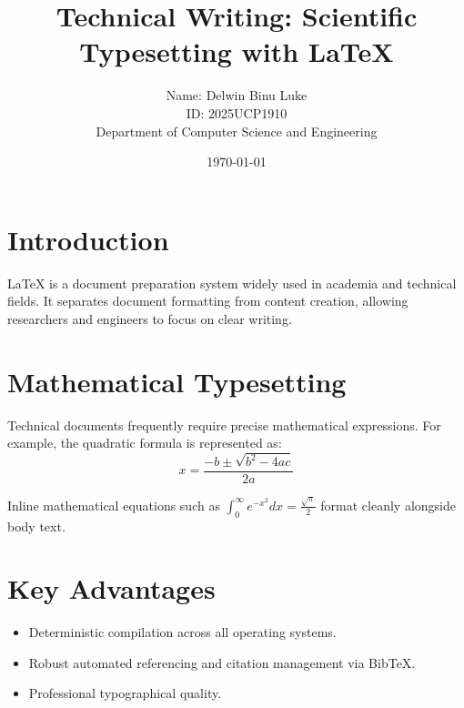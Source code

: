 \documentclass[11pt,a4paper]{article}
\title{\textbf{Technical Writing: Scientific Typesetting with \LaTeX}}
\author{Name: Delwin Binu Luke \\ ID: 2025UCP1910 \\ Department of Computer Science and Engineering }
\date{\today}
\begin{document}
\maketitle

\section{Introduction}
\LaTeX{} is a document preparation system widely used in academia and technical fields. It separates document formatting from content creation, allowing researchers and engineers to focus on clear writing.

\section{Mathematical Typesetting}
Technical documents frequently require precise mathematical expressions. For example, the quadratic formula is represented as:
\begin{equation}
x = \frac{-b \pm \sqrt{b^2 - 4ac}}{2a}
\end{equation}

Inline mathematical equations such as $\int_{0}^{\infty} e^{-x^2} dx = \frac{\sqrt{\pi}}{2}$ format cleanly alongside body text.

\section{Key Advantages}
\begin{itemize}
    \item Deterministic compilation across all operating systems.
    \item Robust automated referencing and citation management via Bib\TeX.
    \item Professional typographical quality.
\end{itemize}
\end{document}
